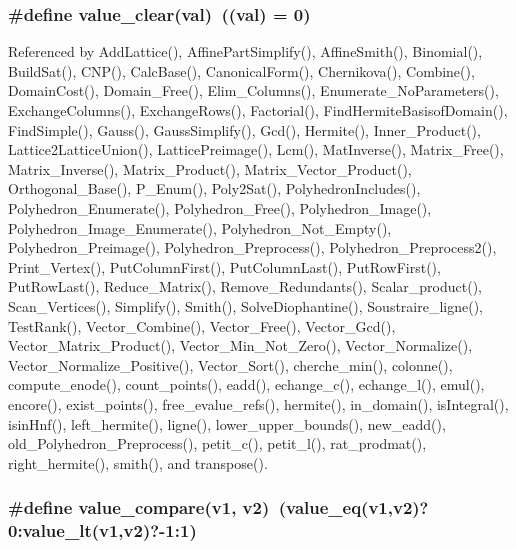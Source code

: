 \subsubsection{\setlength{\rightskip}{0pt plus 5cm}\#define value\_\-clear(val)\ ((val) = 0)}\label{arithmetique_8h_a14}




Referenced by Add\-Lattice(), Affine\-Part\-Simplify(), Affine\-Smith(), Binomial(), Build\-Sat(), CNP(), Calc\-Base(), Canonical\-Form(), Chernikova(), Combine(), Domain\-Cost(), Domain\_\-Free(), Elim\_\-Columns(), Enumerate\_\-No\-Parameters(), Exchange\-Columns(), Exchange\-Rows(), Factorial(), Find\-Hermite\-Basisof\-Domain(), Find\-Simple(), Gauss(), Gauss\-Simplify(), Gcd(), Hermite(), Inner\_\-Product(), Lattice2Lattice\-Union(), Lattice\-Preimage(), Lcm(), Mat\-Inverse(), Matrix\_\-Free(), Matrix\_\-Inverse(), Matrix\_\-Product(), Matrix\_\-Vector\_\-Product(), Orthogonal\_\-Base(), P\_\-Enum(), Poly2Sat(), Polyhedron\-Includes(), Polyhedron\_\-Enumerate(), Polyhedron\_\-Free(), Polyhedron\_\-Image(), Polyhedron\_\-Image\_\-Enumerate(), Polyhedron\_\-Not\_\-Empty(), Polyhedron\_\-Preimage(), Polyhedron\_\-Preprocess(), Polyhedron\_\-Preprocess2(), Print\_\-Vertex(), Put\-Column\-First(), Put\-Column\-Last(), Put\-Row\-First(), Put\-Row\-Last(), Reduce\_\-Matrix(), Remove\_\-Redundants(), Scalar\_\-product(), Scan\_\-Vertices(), Simplify(), Smith(), Solve\-Diophantine(), Soustraire\_\-ligne(), Test\-Rank(), Vector\_\-Combine(), Vector\_\-Free(), Vector\_\-Gcd(), Vector\_\-Matrix\_\-Product(), Vector\_\-Min\_\-Not\_\-Zero(), Vector\_\-Normalize(), Vector\_\-Normalize\_\-Positive(), Vector\_\-Sort(), cherche\_\-min(), colonne(), compute\_\-enode(), count\_\-points(), eadd(), echange\_\-c(), echange\_\-l(), emul(), encore(), exist\_\-points(), free\_\-evalue\_\-refs(), hermite(), in\_\-domain(), is\-Integral(), isin\-Hnf(), left\_\-hermite(), ligne(), lower\_\-upper\_\-bounds(), new\_\-eadd(), old\_\-Polyhedron\_\-Preprocess(), petit\_\-c(), petit\_\-l(), rat\_\-prodmat(), right\_\-hermite(), smith(), and transpose().

\subsubsection{\setlength{\rightskip}{0pt plus 5cm}\#define value\_\-compare(v1, v2)\ (value\_\-eq(v1,v2)?0:value\_\-lt(v1,v2)?-1:1)}\label{arithmetique_8h_a29}


